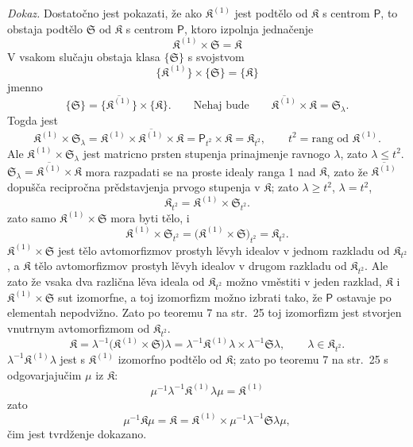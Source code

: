 \documentclass[11pt]{article}
\begin{document}
\emph{Dokaz.} Dostatočno jest pokazati, že ako \(\mathfrak K^{(1)}\) jest podtělo od \(\mathfrak K\) s centrom \(\mathsf P\), to obstaja podtělo \(\mathfrak S\) od \(\mathfrak K\) s centrom \(\mathsf P\), ktoro izpolnja jednačenje
\[
\mathfrak K^{(1)}\times\mathfrak S=\mathfrak K
\]
V vsakom slučaju obstaja klasa \(\{\mathfrak S\}\) s svojstvom
\[
\{\mathfrak K^{(1)}\}\times\{\mathfrak S\}=\{\mathfrak K\}
\]
jmenno
\[
\{\mathfrak S\}=\{\overline{\mathfrak K^{(1)}}\}\times\{\mathfrak K\}.
\qquad
\text{Nehaj bude}\qquad
\overline{\mathfrak K^{(1)}}\times\mathfrak K=\mathfrak S_\lambda.
\]
Togda jest
\[
\mathfrak K^{(1)}\times\mathfrak S_\lambda
=\mathfrak K^{(1)}\times\overline{\mathfrak K^{(1)}}\times\mathfrak K
=\mathsf P_{t^2}\times\mathfrak K
=\mathfrak K_{t^2},
\qquad
t^2=\text{rang od }\mathfrak K^{(1)}.
\]
Ale \(\mathfrak K^{(1)}\times\mathfrak S_\lambda\) jest matricno prsten stupenja prinajmenje ravnogo \(\lambda\), zato \(\lambda\leq t^2\). \(\mathfrak S_\lambda=\overline{\mathfrak K^{(1)}}\times\mathfrak K\) mora razpadati se na proste idealy ranga 1 nad \(\mathfrak K\), zato že \(\overline{\mathfrak K^{(1)}}\) dopušča recipročna prědstavjenja prvogo stupenja v \(\mathfrak K\); zato \(\lambda\geq t^2\), \(\lambda=t^2\),
\[
\mathfrak K_{t^2}=\mathfrak K^{(1)}\times\mathfrak S_{t^2}.
\]
zato samo \(\mathfrak K^{(1)}\times\mathfrak S\) mora byti tělo, i
\[
\mathfrak K^{(1)}\times\mathfrak S_{t^2}
=\bigl(\mathfrak K^{(1)}\times\mathfrak S\bigr)_{t^2}
=\mathfrak K_{t^2}.
\]
\(\mathfrak K^{(1)}\times\mathfrak S\) jest tělo avtomorfizmov prostyh lěvyh idealov v jednom razkladu od \(\mathfrak K_{t^2}\), a \(\mathfrak K\) tělo avtomorfizmov prostyh lěvyh idealov v drugom razkladu od \(\mathfrak K_{t^2}\). Ale zato že vsaka dva različna lěva ideala od \(\mathfrak K_{t^2}\) možno vměstiti v jeden razklad, \(\mathfrak K\) i \(\mathfrak K^{(1)}\times\mathfrak S\) sut izomorfne, a toj izomorfizm možno izbrati tako, že \(\mathsf P\) ostavaje po elementah nepodvižno. Zato po teoremu 7 na str.~25 toj izomorfizm jest stvorjen vnutrnym avtomorfizmom od \(\mathfrak K_{t^2}\).
\[
\mathfrak K
=\lambda^{-1}\bigl(\mathfrak K^{(1)}\times\mathfrak S\bigr)\lambda
=\lambda^{-1}\mathfrak K^{(1)}\lambda\times\lambda^{-1}\mathfrak S\lambda,
\qquad
\lambda\in\mathfrak K_{t^2}.
\]
\(\lambda^{-1}\mathfrak K^{(1)}\lambda\) jest s \(\mathfrak K^{(1)}\) izomorfno podtělo od \(\mathfrak K\); zato po teoremu 7 na str.~25 s odgovarjajučim \(\mu\) iz \(\mathfrak K\):
\[
\mu^{-1}\lambda^{-1}\mathfrak K^{(1)}\lambda\mu=\mathfrak K^{(1)}
\]
zato
\[
\mu^{-1}\mathfrak K\mu
=\mathfrak K
=\mathfrak K^{(1)}\times\mu^{-1}\lambda^{-1}\mathfrak S\lambda\mu,
\]
čim jest tvrdženje dokazano.
\end{document}
